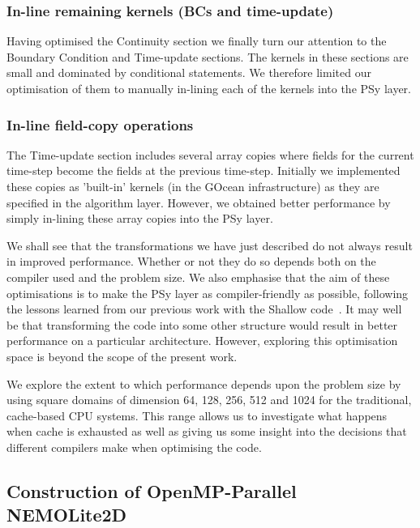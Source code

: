 \documentclass[gmd, manuscript]{copernicus}
\begin{document}
\subsubsection{In-line remaining kernels (BCs and time-update)}
\label{sec_inline_all_kernels}

Having optimised the Continuity section we finally turn our attention
to the Boundary Condition and Time-update sections. The kernels in
these sections are small and dominated by conditional statements.  We
therefore limited our optimisation of them to manually in-lining each
of the kernels into the PSy layer.

\subsubsection{In-line field-copy operations}
\label{sec_inline_fldcopy}

The Time-update section includes several array copies where fields for
the current time-step become the fields at the previous time-step.
Initially we implemented these copies as 'built-in' kernels (in the
GOcean infrastructure) as they are specified in the algorithm
layer. However, we obtained better performance by simply in-lining
these array copies into the PSy layer.

We shall see that the transformations we have just described do not
always result in improved performance. Whether or not they do so
depends both on the compiler used and the problem size. We also
emphasise that the aim of these optimisations is to make the PSy layer
as compiler-friendly as possible, following the lessons learned from
our previous work with the Shallow code~\citep{shallow_psykal}. It may
well be that transforming the code into some other structure would
result in better performance on a particular architecture. However,
exploring this optimisation space is beyond the scope of the present
work.

We explore the extent to which performance depends upon the problem
size by using square domains of dimension 64, 128, 256, 512 and 1024
for the traditional, cache-based CPU systems. This range allows us to
investigate what happens when cache is exhausted as well as giving us
some insight into the decisions that different compilers make when
optimising the code.

\subsection{Construction of OpenMP-Parallel NEMOLite2D}
\label{sec_omp_steps}
\end{document}
